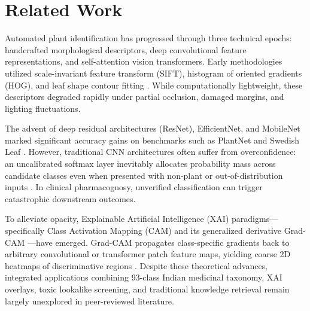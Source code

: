 \documentclass[sn-mathphys,Numbered]{sn-jnl}%
\begin{document}
\section{Related Work}\label{sec2}
Automated plant identification has progressed through three technical epochs: handcrafted morphological descriptors, deep convolutional feature representations, and self-attention vision transformers. Early methodologies utilized scale-invariant feature transform (SIFT), histogram of oriented gradients (HOG), and leaf shape contour fitting \cite{kumar2012leafsnap, waldchen2018machine}. While computationally lightweight, these descriptors degraded rapidly under partial occlusion, damaged margins, and lighting fluctuations.

The advent of deep residual architectures (ResNet), EfficientNet, and MobileNet marked significant accuracy gains on benchmarks such as PlantNet and Swedish Leaf \cite{he2016deep, howard2019searching, tan2019efficientnet}. However, traditional CNN architectures often suffer from overconfidence: an uncalibrated softmax layer inevitably allocates probability mass across candidate classes even when presented with non-plant or out-of-distribution inputs \cite{guo2017calibration}. In clinical pharmacognosy, unverified classification can trigger catastrophic downstream outcomes.

To alleviate opacity, Explainable Artificial Intelligence (XAI) paradigms---specifically Class Activation Mapping (CAM) and its generalized derivative Grad-CAM \cite{selvaraju2020grad}---have emerged. Grad-CAM propagates class-specific gradients back to arbitrary convolutional or transformer patch feature maps, yielding coarse 2D heatmaps of discriminative regions \cite{dosovitskiy2020image}. Despite these theoretical advances, integrated applications combining 93-class Indian medicinal taxonomy, XAI overlays, toxic lookalike screening, and traditional knowledge retrieval remain largely unexplored in peer-reviewed literature.
\end{document}
